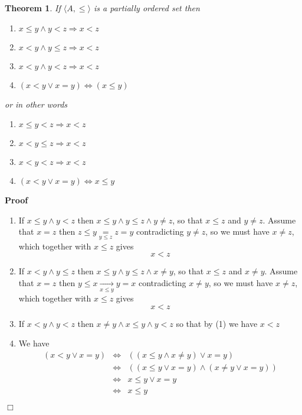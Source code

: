 \documentclass{book}
\newcommand{\Rightarrowlim}{\mathop{\rightarrow}\limits}
\newcommand{\equallim}{\mathop{=}\limits}
\newenvironment{proof}{\noindent\textbf{Proof\ }}{\hspace*{\fill}$\Box$\medskip}
\newtheorem{theorem}{Theorem}
\begin{document}
\begin{theorem}
  \label{order strict order}If $\langle A, \leqslant \rangle$ is a partially
  ordered set then
  \begin{enumerate}
    \item $x \leqslant y \wedge y < z \Rightarrow x < z$
    
    \item $x < y \wedge y \leqslant z \Rightarrow x < z$
    
    \item $x < y \wedge y < z \Rightarrow x < z$
    
    \item $(x < y \vee x = y) \Leftrightarrow (x \leqslant y)$
  \end{enumerate}
  or in other words
  \begin{enumerate}
    \item $x \leqslant y < z \Rightarrow x < z$
    
    \item $x < y \leqslant z \Rightarrow x < z$
    
    \item $x < y < z \Rightarrow x < z$
    
    \item $(x < y \vee x = y) \Leftrightarrow x \leqslant y$
  \end{enumerate}
\end{theorem}

\begin{proof}
  
  \begin{enumerate}
    \item If $x \leqslant y \wedge y < z$ then $x \leqslant y \wedge y
    \leqslant z \wedge y \neq z$, so that $x \leqslant z$ and $y \neq z$.
    Assume that $x = z$ then $z \leqslant y \equallim_{y \leqslant z} z = y$
    contradicting $y \neq z$, so we must have $x \neq z$, which together with
    $x \leqslant z$ gives
    \[ x < z \]
    \item If $x < y \wedge y \leqslant z$ then $x \leqslant y \wedge y
    \leqslant z \wedge x \neq y$, so that $x \leqslant z$ and $x \neq y$.
    Assume that $x = z$ then $y \leqslant x \Rightarrowlim_{x \leqslant y} y =
    x$ contradicting $x \neq y$, so we must have $x \neq z$, which together
    with $x \leqslant z$ gives
    \[ x < z \]
    \item If $x < y \wedge y < z$ then $x \neq y \wedge x \leqslant y \wedge y
    < z$ so that by (1) we have $x < z$
    
    \item We have
    \begin{eqnarray*}
      (x < y \vee x = y) & \Leftrightarrow & ((x \leqslant y \wedge x \neq y)
      \vee x = y)\\
      & \Leftrightarrow & ((x \leqslant y \vee x = y) \wedge (x \neq y \vee x
      = y))\\
      & \Leftrightarrow & x \leqslant y \vee x = y\\
      & \Leftrightarrow & x \leqslant y
    \end{eqnarray*}
  \end{enumerate}
\end{proof}
\end{document}
